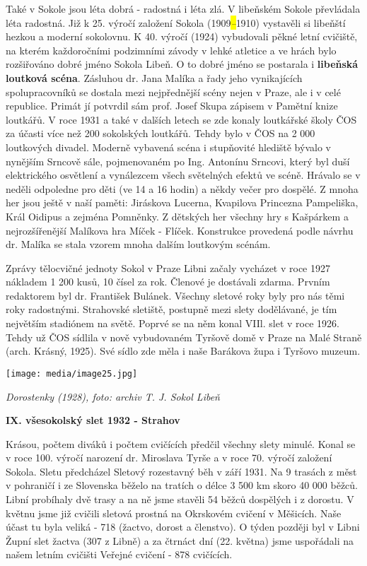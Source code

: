 Také v Sokole jsou léta dobrá - radostná i léta zlá. V libeňském Sokole
převládala léta radostná. Již k 25. výročí založení Sokola
(1909\emph{\hl{--}}1910) vystavěli si libeňští hezkou a moderní
sokolovnu. K 40. výročí (1924) vybudovali pěkné letní cvičiště, na
kterém každoročními podzimními závody v lehké atletice a ve hrách bylo
rozšiřováno dobré jméno Sokola Libeň. O to dobré jméno se postarala i
\textbf{libeňská loutková scéna}. Zásluhou dr. Jana Malíka a řady jeho
vynikajících spolupracovníků se dostala mezi nejpřednější scény nejen v
Praze, ale i v celé republice. Primát jí potvrdil sám prof. Josef Skupa
zápisem v Pamětní knize loutkářů. V roce 1931 a také v dalších letech se
zde konaly loutkářské školy ČOS za účasti více než 200 sokolských
loutkářů. Tehdy bylo v ČOS na 2 000 loutkových divadel. Moderně vybavená
scéna i stupňovité hlediště bývalo v nynějším Srncově sále, pojmenovaném
po Ing. Antonínu Srncovi, který byl duší elektrického osvětlení a
vynálezcem všech světelných efektů ve scéně. Hrávalo se v neděli
odpoledne pro děti (ve 14 a 16 hodin) a někdy večer pro dospělé. Z mnoha
her jsou ještě v naší paměti: Jiráskova Lucerna, Kvapilova Princezna
Pampeliška, Král Oidipus a zejména Pomněnky. Z dětských her všechny hry
s Kašpárkem a nejrozšířenější Malíkova hra Míček - Flíček. Konstrukce
provedená podle návrhu dr. Malíka se stala vzorem mnoha dalším loutkovým
scénám.

Zprávy tělocvičné jednoty Sokol v Praze Libni začaly vycházet v roce
1927 nákladem 1 200 kusů, 10 čísel za rok. Členové je dostávali zdarma.
Prvním redaktorem byl dr. František Bulánek. Všechny sletové roky byly
pro nás těmi roky radostnými. Strahovské sletiště, postupně mezi slety
dodělávané, je tím největším stadiónem na světě. Poprvé se na něm konal
VIIl. slet v roce 1926. Tehdy už ČOS sídlila v nově vybudovaném Tyršově
domě v Praze na Malé Straně (arch. Krásný, 1925). Své sídlo zde měla i
naše Barákova župa i Tyršovo muzeum.

\texttt{[image: media/image25.jpg]}

\emph{Dorostenky (1928), foto: archiv T. J. Sokol Libeň}

\textbf{IX. všesokolský slet 1932 - Strahov}

Krásou, počtem diváků i počtem cvičících předčil všechny slety minulé.
Konal se v roce 100. výročí narození dr. Miroslava Tyrše a v roce 70.
výročí založení Sokola. Sletu předcházel Sletový rozestavný běh v září
1931. Na 9 trasách z měst v pohraničí i ze Slovenska běželo na tratích o
délce 3 500 km skoro 40 000 běžců. Libní probíhaly dvě trasy a na ně
jsme stavěli 54 běžců dospělých i z dorostu. V květnu jsme již cvičili
sletová prostná na Okrskovém cvičení v Měšicích. Naše účast tu byla
veliká - 718 (žactvo, dorost a členstvo). O týden později byl v Libni
Župní slet žactva (307 z Libně) a za čtrnáct dní (22. května) jsme
uspořádali na našem letním cvičišti Veřejné cvičení - 878 cvičících.

